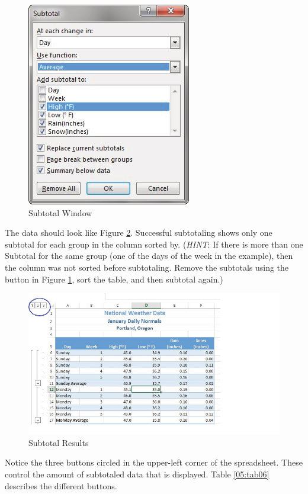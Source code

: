 \begin{figure}[H]
	\centering
	\includegraphics[width=\maxwidth{.95\linewidth}]{gfx/ch05_fig24}
	\caption{Subtotal Window}
	\label{05:fig24}
\end{figure}

The data should look like Figure \ref{05:fig25}. Successful subtotaling shows only one subtotal for each group in the column sorted by. (\textit{HINT}: If there is more than one Subtotal for the same group (\ie one of the days of the week in the example), then the column was not sorted before subtotaling. Remove the subtotals using the  button in Figure \ref{05:fig24}, sort the table, and then subtotal again.)

\begin{figure}[H]
	\centering
	\includegraphics[width=\maxwidth{.95\linewidth}]{gfx/ch05_fig25}
	\caption{Subtotal Results}
	\label{05:fig25}
\end{figure}

Notice the three  buttons circled in the upper-left corner of the spreadsheet. These control the amount of subtotaled data that is displayed. Table \ref{05:tab06} describes the different  buttons.


